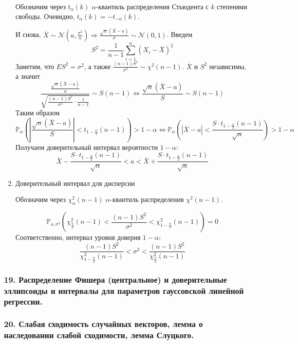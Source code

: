 \documentclass[12pt, russian]{article}
\begin{document}
\begin{enumerate}
\noindent Обозначим через $t_\alpha(k)$ $\alpha$-квантиль распределения Стьюдента с $k$ степенями свободы. Очевидно, $t_\alpha(k) = -t_{-\alpha}(k)$.

И снова, $\overline{X} \sim \mathcal{N}(a, \frac{\sigma^2}{n}) \Longrightarrow \frac{\sqrt{n}(\overline{X} - a)}{\sigma}\sim\mathcal{N}(0,1)$. Введем
$$ S^2 = \frac{1}{n-1}\sum\limits_{i=1}^n{(X_i - \overline{X})^2}$$
Заметим, что $ES^2 = \sigma^2$, а также $\frac{(n-1)S^2}{\sigma^2} \sim\chi^2(n-1)$. $\overline{X}$ и $S^2$ независимы, а значит
$$ \frac{\frac{\sqrt{n}(\overline{X} - a)}{\sigma}}{\sqrt{\frac{(n-1)S^2}{\sigma^2}\cdot\frac{1}{n-1}}} \sim S(n-1) \Longleftrightarrow \frac{\sqrt{n}(\overline{X} - a)}{S}\sim S(n-1)$$
Таким образом
$$ \mathbb{P}_\alpha\left(\left|\frac{\sqrt{n}(\overline{X} - a)}{S} \right| < t_{1 - \frac{\alpha}{2}}(n-1)\right) > 1 - \alpha \Longleftrightarrow \mathbb{P}_\alpha\left(|\overline{X} - a| < \frac{S\cdot t_{1 - \frac{\alpha}{2}}(n-1)}{\sqrt{n}}\right) > 1 - \alpha $$ 
Получаем доверительный интервал вероятности $1-\alpha$:
$$ \overline{X} - \frac{S\cdot t_{1 - \frac{\alpha}{2}}(n-1)}{\sqrt{n}} < a < \overline{X} + \frac{S\cdot t_{1 - \frac{\alpha}{2}}(n-1)}{\sqrt{n}} $$

\item Доверительный интервал для дисперсии

\noindent Обозначим через $\chi^2_\alpha(n-1)$ $\alpha$-квантиль распределения $\chi^2(n-1)$.

$$ \mathbb{P}_{a, \sigma^2}\left( \chi^2_{\frac{\alpha}{2}}(n-1) < \frac{(n-1)S^2}{\sigma^2} < \chi^2_{1 - \frac{\alpha}{2}}(n-1)\right) = 0$$
Соответственно, интервал уровня доверия $1-\alpha$:
$$ \frac{(n-1)S^2}{\chi^2_{1-\frac{\alpha}{2}}(n-1)} < \sigma^2 < \frac{(n-1)S^2}{\chi^2_{\frac{\alpha}{2}}(n-1)}$$

\end{enumerate}

\newpage
\subsubsection*{19. Распределение Фишера (центральное) и доверительные эллипсоиды и интервалы для параметров гауссовской линейной регрессии.}

\newpage
\subsubsection*{20. Слабая сходимость случайных векторов, лемма о наследовании слабой сходимости, лемма Слуцкого.}
\end{document}

